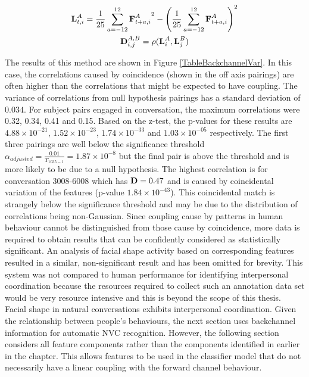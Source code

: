 \begin{gather}
\label{EqnVarianceSlidingWindow}
\textbf{L}^A_{t,i} = \frac{1}{25} \displaystyle\sum\limits^{12}_{a=-12} {\textbf{F}^A_{t+a,i}}^2 - \left( \frac{1}{25}\displaystyle\sum\limits^{12}_{a=-12} {\textbf{F}^A_{t+a,i}} \right)^2\\
\textbf{D}^{A,B}_{i,j} = \rho(\textbf{L}^A_i, \textbf{L}^B_j)
\end{gather}

The results of this method are shown in Figure \ref{TableBackchannelVar}. In this case, the correlations caused by coincidence (shown in the off axis pairings) are often higher than the correlations that might be expected to have coupling. The variance of correlations from null hypothesis pairings has a standard deviation of $0.034$. For subject pairs engaged in conversation, the maximum correlations were 0.32, 0.34, 0.41 and 0.15. Based on the z-test, the p-values for these results are $4.88\times10^{-21}$, $1.52\times10^{-23}$, $1.74\times10^{-33}$ and $1.03\times10^{-05}$ respectively. The first three pairings are well below the significance threshold $\alpha_{adjusted} = \frac{0.01}{T_{1035-1}}=1.87\times10^{-8}$ but the final pair is above the threshold and is more likely to be due to a null hypothesis. The highest correlation is for conversation 3008-6008 which has $\textbf{D}=0.47$ and is caused by coincidental variation of the features (p-value $1.84\times10^{-43}$). This coincidental match is strangely below the significance threshold and may be due to the distribution of correlations being non-Gaussian. Since coupling cause by patterns in human behaviour cannot be distinguished from those cause by coincidence, more data is required to obtain results that can be confidently considered as statistically significant. An analysis of facial shape activity based on corresponding features resulted in a similar, non-significant result and has been omitted for brevity. This system was not compared to human performance for identifying interpersonal coordination because the resources required to collect such an annotation data set would be very resource intensive and this is beyond the scope of this thesis.
Facial shape in natural conversations exhibits interpersonal coordination. Given the relationship between people's behaviours, the next section uses backchannel information for automatic \ac{NVC} recognition. However, the following section considers all feature components rather than the components identified in earlier in the chapter. This allows features to be used in the classifier model that do not necessarily have a linear coupling with the forward channel behaviour.


